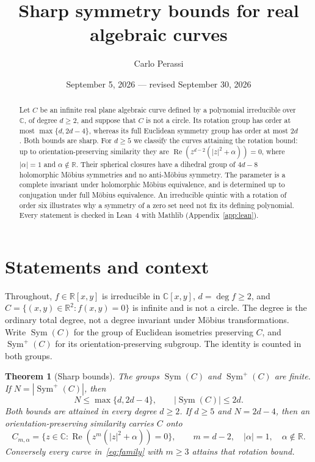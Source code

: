 \documentclass[11pt,a4paper]{article}
\title{Sharp symmetry bounds for real algebraic curves}
\author{Carlo Perassi}
\date{September 5, 2026 --- revised September 30, 2026}
\newtheorem{theorem}{Theorem}
\theoremstyle{definition}
\newcommand{\C}{\mathbb{C}}
\newcommand{\R}{\mathbb{R}}
\DeclareMathOperator{\Sym}{Sym}
\DeclareMathOperator{\Rea}{Re}
\begin{document}
\maketitle

\begin{abstract}
Let $C$ be an infinite real plane algebraic curve defined by a polynomial
irreducible over $\C$, of degree $d\ge2$, and suppose that $C$ is not a circle.
Its rotation group has order at most $\max\{d,2d-4\}$, whereas its full
Euclidean symmetry group has order at most $2d$. Both bounds are sharp.
For $d\ge5$ we classify the curves attaining the rotation bound: up to
orientation-preserving similarity they are
$\Rea(z^{d-2}(|z|^2+\alpha))=0$, where $|\alpha|=1$ and
$\alpha\notin\R$. Their spherical closures have a dihedral group of
$4d-8$ holomorphic M\"obius symmetries and no anti-M\"obius symmetry.
The parameter is a complete invariant under holomorphic M\"obius equivalence,
and is determined up to conjugation under full M\"obius equivalence.
An irreducible quintic with a rotation of order six illustrates why a
symmetry of a zero set need not fix its defining polynomial.
Every statement is checked in Lean~4 with Mathlib
(Appendix~\ref{app:lean}).
\end{abstract}

\section{Statements and context}

Throughout, $f\in\R[x,y]$ is irreducible in $\C[x,y]$,
$d=\deg f\ge2$, and $C=\{(x,y)\in\R^2:f(x,y)=0\}$ is infinite and
is not a circle. The degree is the ordinary total degree, not a degree
invariant under M\"obius transformations. Write $\Sym(C)$ for the group
of Euclidean isometries preserving $C$, and $\Sym^+(C)$ for its
orientation-preserving subgroup. The identity is counted in both groups.

\begin{theorem}[Sharp bounds]\label{thm:bounds}
The groups $\Sym(C)$ and $\Sym^+(C)$ are finite. If
$N=|\Sym^+(C)|$, then
\[
 N\le\max\{d,2d-4\},\qquad |\Sym(C)|\le2d.
\]
Both bounds are attained in every degree $d\ge2$.
If $d\ge5$ and $N=2d-4$, then an orientation-preserving similarity
carries $C$ onto
\begin{equation}\label{eq:family}
 C_{m,\alpha}=\{z\in\C:\Rea(z^m(|z|^2+\alpha))=0\},
 \qquad m=d-2,\quad |\alpha|=1,\quad \alpha\notin\R.
\end{equation}
Conversely every curve in~\eqref{eq:family} with $m\ge3$ attains that
rotation bound.
\end{theorem}
\end{document}
